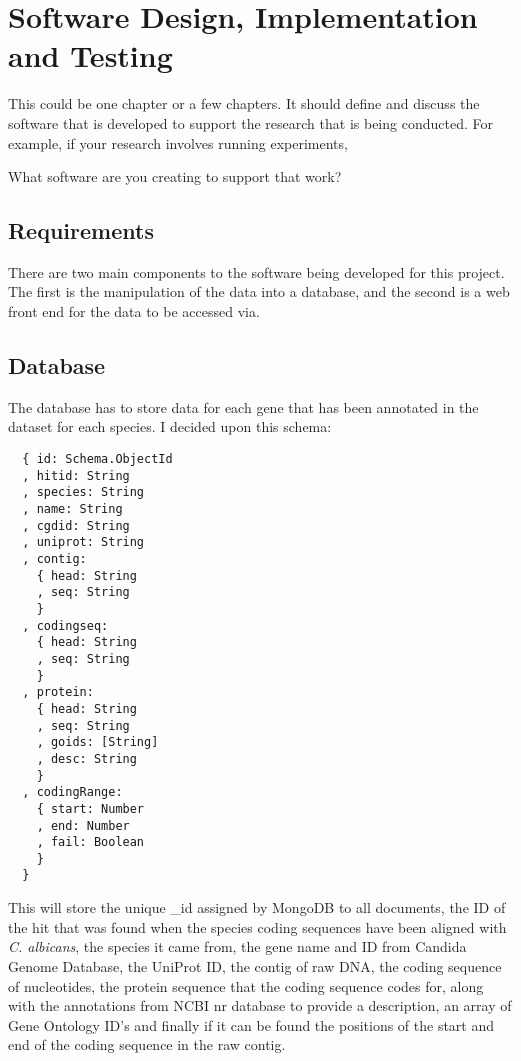 \chapter{Software Design, Implementation and Testing}

This could be one chapter or a few chapters. It should define and discuss the software that is developed to support the research that is being conducted. For example, if your research involves running experiments, 

What software are you creating to support that work?

\section{Requirements}
There are two main components to the software being developed for this project. The first is the manipulation of the data into a database, and the second is a web front end for the data to be accessed via. 

\section{Database}
The database has to store data for each gene that has been annotated in the dataset for each species. I decided upon this schema:

\begin{lstlisting}
  { id: Schema.ObjectId
  , hitid: String
  , species: String
  , name: String
  , cgdid: String
  , uniprot: String
  , contig: 
    { head: String
    , seq: String 
    }
  , codingseq: 
    { head: String
    , seq: String 
    }
  , protein: 
    { head: String
    , seq: String
    , goids: [String]
    , desc: String 
    }
  , codingRange: 
    { start: Number
    , end: Number
    , fail: Boolean 
    }
  }
\end{lstlisting}

This will store the unique \_id assigned by MongoDB to all documents, the ID of the hit that was found when the species coding sequences have been aligned with \textit{C. albicans}, the species it came from, the gene name and ID from Candida Genome Database, the UniProt ID, the contig of raw DNA, the coding sequence of nucleotides, the protein sequence that the coding sequence codes for, along with the annotations from NCBI nr database to provide a description, an array of Gene Ontology\cite{geneontology} ID's and finally if it can be found the positions of the start and end of the coding sequence in the raw contig. 

